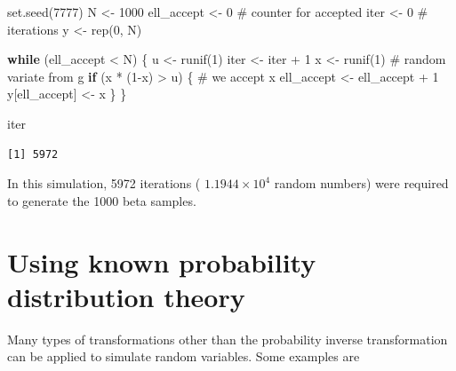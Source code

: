 \documentclass[
  letterpaper,
  DIV=11,
  numbers=noendperiod]{scrreprt}
\newenvironment{Shaded}{\begin{snugshade}}{\end{snugshade}}
\newcommand{\CommentTok}[1]{\textcolor[rgb]{0.37,0.37,0.37}{#1}}
\newcommand{\ControlFlowTok}[1]{\textcolor[rgb]{0.00,0.23,0.31}{\textbf{#1}}}
\newcommand{\DecValTok}[1]{\textcolor[rgb]{0.68,0.00,0.00}{#1}}
\newcommand{\FunctionTok}[1]{\textcolor[rgb]{0.28,0.35,0.67}{#1}}
\newcommand{\NormalTok}[1]{\textcolor[rgb]{0.00,0.23,0.31}{#1}}
\newcommand{\OtherTok}[1]{\textcolor[rgb]{0.00,0.23,0.31}{#1}}
\newcommand{\SpecialCharTok}[1]{\textcolor[rgb]{0.37,0.37,0.37}{#1}}
\begin{document}
\begin{Shaded}
\begin{Highlighting}[]
\FunctionTok{set.seed}\NormalTok{(}\DecValTok{7777}\NormalTok{)}
\NormalTok{N }\OtherTok{\textless{}{-}} \DecValTok{1000}
\NormalTok{ell\_accept }\OtherTok{\textless{}{-}} \DecValTok{0}       \CommentTok{\# counter for accepted}
\NormalTok{iter }\OtherTok{\textless{}{-}} \DecValTok{0}       \CommentTok{\# iterations}
\NormalTok{y }\OtherTok{\textless{}{-}} \FunctionTok{rep}\NormalTok{(}\DecValTok{0}\NormalTok{, N)}

\ControlFlowTok{while}\NormalTok{ (ell\_accept }\SpecialCharTok{\textless{}}\NormalTok{ N) \{}
\NormalTok{  u }\OtherTok{\textless{}{-}} \FunctionTok{runif}\NormalTok{(}\DecValTok{1}\NormalTok{)}
\NormalTok{  iter }\OtherTok{\textless{}{-}}\NormalTok{ iter }\SpecialCharTok{+} \DecValTok{1}
\NormalTok{  x }\OtherTok{\textless{}{-}} \FunctionTok{runif}\NormalTok{(}\DecValTok{1}\NormalTok{)   }\CommentTok{\# random variate from g}
  \ControlFlowTok{if}\NormalTok{ (x }\SpecialCharTok{*}\NormalTok{ (}\DecValTok{1}\SpecialCharTok{{-}}\NormalTok{x) }\SpecialCharTok{\textgreater{}}\NormalTok{ u) \{}
    \CommentTok{\# we accept x}
\NormalTok{    ell\_accept }\OtherTok{\textless{}{-}}\NormalTok{ ell\_accept }\SpecialCharTok{+} \DecValTok{1}
\NormalTok{    y[ell\_accept] }\OtherTok{\textless{}{-}}\NormalTok{ x}
\NormalTok{  \}}
\NormalTok{\}}

\NormalTok{iter}
\end{Highlighting}
\end{Shaded}

\begin{verbatim}
[1] 5972
\end{verbatim}

In this simulation, 5972 iterations ( \ensuremath{1.1944\times 10^{4}}
random numbers) were required to generate the 1000 beta samples.

\section{Using known probability distribution
theory}\label{using-known-probability-distribution-theory}

Many types of transformations other than the probability inverse
transformation can be applied to simulate random variables. Some
examples are
\end{document}
